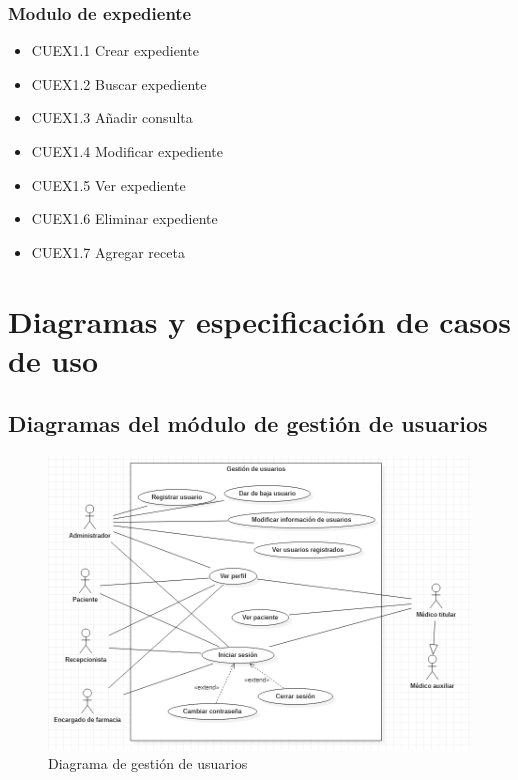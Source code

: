 \documentclass[12pt,letterpaper]{article}
\begin{document}
                \subsubsection{Modulo de expediente}
                    \begin{itemize}
                        \item CUEX1.1 Crear expediente 
                        \item CUEX1.2 Buscar expediente 
                        \item CUEX1.3 Añadir consulta 
                        \item CUEX1.4 Modificar expediente 
                        \item CUEX1.5 Ver expediente 
                        \item CUEX1.6 Eliminar expediente 
                        \item CUEX1.7 Agregar receta
                    \end{itemize}

    \section{Diagramas y especificación de casos de uso}
        \subsection{Diagramas del módulo de gestión de usuarios}
            \begin{figure}[H]
                \centering
                \includegraphics [scale=0.5]{casosUso/gestionUsuarios}
                \caption{Diagrama de gestión de usuarios}
            \end{figure}
\end{document}
